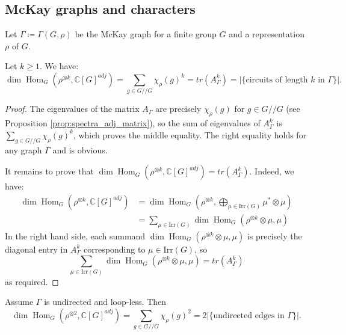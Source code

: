 \documentclass[ALCO]{cedram}
\newcommand{\Hom}{\operatorname{Hom}}
\newcommand{\C}{{\mathbb C}}
\newcommand{\abs}[1]{\left|{#1}\right|}
\newcommand{\Hom}{\operatorname{Hom}}
\begin{document}
\subsection{McKay graphs and characters}
Let $\Gamma \coloneqq  \Gamma(G, \rho)$ be the McKay graph for a finite group $G$ and a representation $\rho$ of $G$. 
\begin{lemma}\label{lem:trace}
 Let $k\geq 1$. We have: 
 $$
\dim \Hom_G(\rho^{\otimes k}, \C[G]^{adj}) = \sum_{g \in G//G} \chi_\rho(g)^k = tr(A^k_{\Gamma}) = \abs{\{\text{circuits of length } k \text{ in } \Gamma \}}.  $$

\end{lemma}
\begin{proof}
 The eigenvalues of the matrix $A_{\Gamma}$ are precisely $\chi_\rho(g)$ for $g \in G//G$ (see Proposition \ref{prop:spectra_adj_matrix}), so the sum of eigenvalues of $A^k_{\Gamma}$ is $\sum_{g \in G//G} \chi_\rho(g)^k $, which proves the middle equality. The right equality holds for any graph $\Gamma$ and is obvious.
 
 It remains to prove that $\dim \Hom_G(\rho^{\otimes k}, \C[G]^{adj}) = tr(A^k_{\Gamma})$. Indeed, we have:
 \begin{align*}
 \dim \Hom_G(\rho^{\otimes k}, \C[G]^{adj}) &= \dim \Hom_G(\rho^{\otimes k}, \bigoplus_{\mu \in \mathrm{Irr}(G)} \mu^* \otimes \mu) \\
 &= \sum_{\mu \in \mathrm{Irr}(G)} \dim \Hom_G(\rho^{\otimes k}\otimes \mu, \mu)
 \end{align*}
 In the right hand side, each summand $\dim \Hom_G(\rho^{\otimes k}\otimes \mu, \mu)$ is precisely the diagonal entry in $A^k_{\Gamma}$ corresponding to $\mu \in \mathrm{Irr}(G)$, so $$\sum_{\mu \in \mathrm{Irr}(G)} \dim \Hom_G(\rho^{\otimes k}\otimes \mu, \mu)= tr(A^k_{\Gamma})$$ as required.
\end{proof}

\begin{coro}\label{cor:trace}
 Assume $\Gamma$ is undirected and loop-less. Then $$\dim \Hom_G(\rho^{\otimes 2}, \C[G]^{adj}) =\sum_{g \in G//G} \chi_\rho(g)^2 = 2\abs{\{\text{undirected edges in } \Gamma\}}.$$
\end{coro}
\end{document}
